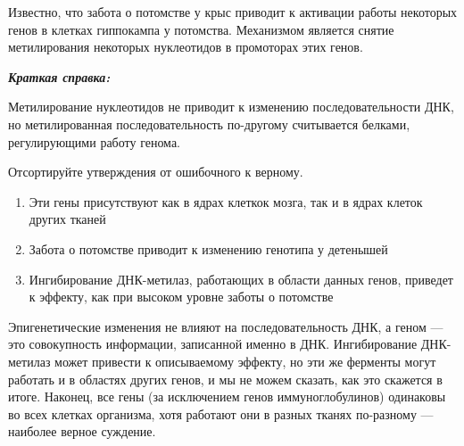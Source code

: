 
Известно, что забота о потомстве у крыс приводит к активации работы некоторых генов в клетках гиппокампа у потомства. Механизмом является снятие метилирования некоторых нуклеотидов в промоторах этих генов.

\textbf{\textit{Краткая справка:}}

Метилирование нуклеотидов не приводит к изменению последовательности ДНК, но метилированная последовательность по-другому считывается белками, регулирующими работу генома.

Отсортируйте утверждения от ошибочного к верному.

\begin{enumerate}
    \item Эти гены присутствуют как в ядрах клеткок мозга, так и в ядрах клеток других тканей
    \item Забота о потомстве приводит к изменению генотипа у детенышей
    \item Ингибирование ДНК-метилаз, работающих в области данных генов, приведет к эффекту, как при высоком уровне заботы о потомстве
\end{enumerate}

\commentsSection

Эпигенетические изменения не влияют на последовательность ДНК, а геном — это совокупность информации, записанной именно в ДНК. Ингибирование ДНК-метилаз может привести к описываемому эффекту, но эти же ферменты могут работать и в областях других генов, и мы не можем сказать, как это скажется в итоге. Наконец, все гены (за исключением генов иммуноглобулинов) одинаковы во всех клетках организма, хотя работают они в разных тканях по-разному — наиболее верное суждение. 

